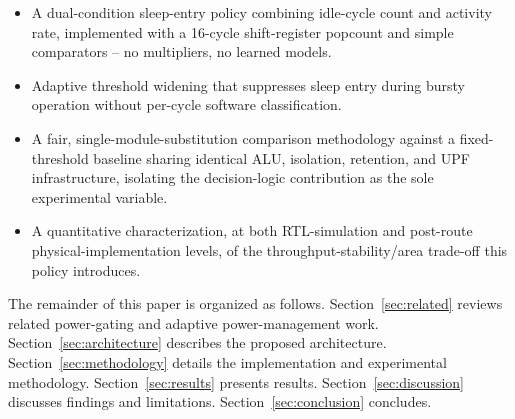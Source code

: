 \begin{itemize}
\item A dual-condition sleep-entry policy combining idle-cycle count and activity rate, implemented with a 16-cycle shift-register popcount and simple comparators -- no multipliers, no learned models.
\item Adaptive threshold widening that suppresses sleep entry during bursty operation without per-cycle software classification.
\item A fair, single-module-substitution comparison methodology against a fixed-threshold baseline sharing identical ALU, isolation, retention, and UPF infrastructure, isolating the decision-logic contribution as the sole experimental variable.
\item A quantitative characterization, at both RTL-simulation and post-route physical-implementation levels, of the throughput-stability/area trade-off this policy introduces.
\end{itemize}

The remainder of this paper is organized as follows. Section~\ref{sec:related} reviews related power-gating and adaptive power-management work. Section~\ref{sec:architecture} describes the proposed architecture. Section~\ref{sec:methodology} details the implementation and experimental methodology. Section~\ref{sec:results} presents results. Section~\ref{sec:discussion} discusses findings and limitations. Section~\ref{sec:conclusion} concludes.